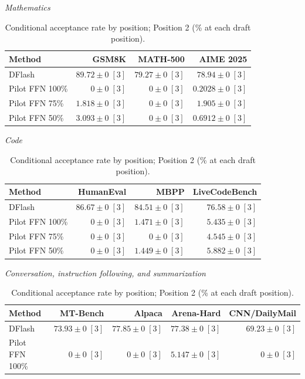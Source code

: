 \begin{table}[!htp]
\centering\small
\setlength{\tabcolsep}{3pt}
\caption{Conditional acceptance rate by position; Position 2 (\% at each draft position).}
\label{tab:appendix-metric-conditional-acceptance-2}
\textit{Mathematics}\par\smallskip
\begin{tabular}{@{}>{\raggedright\arraybackslash}p{3.7cm}rrr@{}}
\toprule
Method & GSM8K & MATH-500 & AIME 2025 \\
\midrule
DFlash & \(\mathbf{89.72} \pm 0\;[3]\) & \(\mathbf{79.27} \pm 0\;[3]\) & \(\mathbf{78.94} \pm 0\;[3]\) \\
Pilot FFN 100\% & \(0 \pm 0\;[3]\) & \(0 \pm 0\;[3]\) & \(0.2028 \pm 0\;[3]\) \\
Pilot FFN 75\% & \(1.818 \pm 0\;[3]\) & \(0 \pm 0\;[3]\) & \(1.905 \pm 0\;[3]\) \\
Pilot FFN 50\% & \(3.093 \pm 0\;[3]\) & \(0 \pm 0\;[3]\) & \(0.6912 \pm 0\;[3]\) \\
\bottomrule
\end{tabular}\par\medskip
\textit{Code}\par\smallskip
\begin{tabular}{@{}>{\raggedright\arraybackslash}p{3.7cm}rrr@{}}
\toprule
Method & HumanEval & MBPP & LiveCodeBench \\
\midrule
DFlash & \(\mathbf{86.67} \pm 0\;[3]\) & \(\mathbf{84.51} \pm 0\;[3]\) & \(\mathbf{76.58} \pm 0\;[3]\) \\
Pilot FFN 100\% & \(0 \pm 0\;[3]\) & \(1.471 \pm 0\;[3]\) & \(5.435 \pm 0\;[3]\) \\
Pilot FFN 75\% & \(0 \pm 0\;[3]\) & \(0 \pm 0\;[3]\) & \(4.545 \pm 0\;[3]\) \\
Pilot FFN 50\% & \(0 \pm 0\;[3]\) & \(1.449 \pm 0\;[3]\) & \(5.882 \pm 0\;[3]\) \\
\bottomrule
\end{tabular}\par\medskip
\textit{Conversation, instruction following, and summarization}\par\smallskip
\begin{tabular}{@{}>{\raggedright\arraybackslash}p{3.7cm}rrrr@{}}
\toprule
Method & MT-Bench & Alpaca & Arena-Hard & CNN/DailyMail \\
\midrule
DFlash & \(\mathbf{73.93} \pm 0\;[3]\) & \(\mathbf{77.85} \pm 0\;[3]\) & \(\mathbf{77.38} \pm 0\;[3]\) & \(\mathbf{69.23} \pm 0\;[3]\) \\
Pilot FFN 100\% & \(0 \pm 0\;[3]\) & \(0 \pm 0\;[3]\) & \(5.147 \pm 0\;[3]\) & \(0 \pm 0\;[3]\) \\

\end{tabular}
\end{table}
